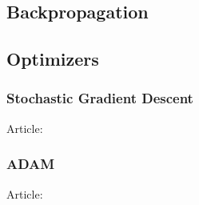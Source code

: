 \subsection{Backpropagation}


\subsection{Optimizers}

\subsubsection{Stochastic Gradient Descent}
Article: \cite{stochasticgradientdescent}

\subsubsection{ADAM}
Article: \cite{kingma2015adam}
